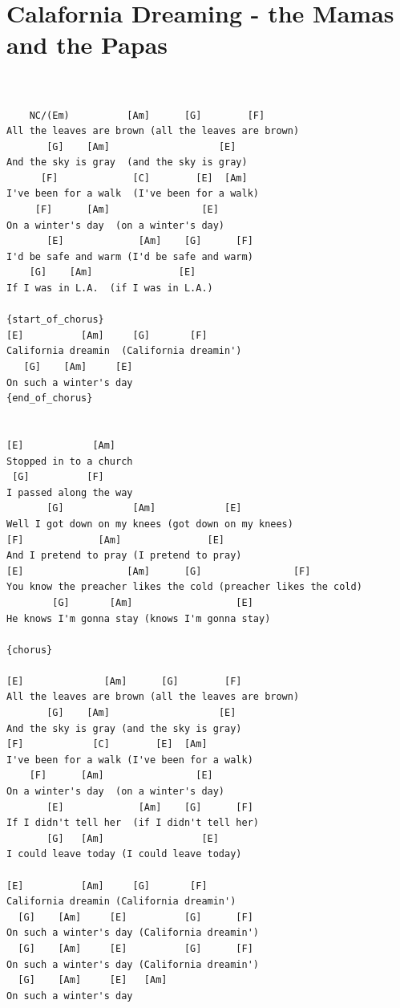 \documentclass[]{book}
\let\stdsection\section
\renewcommand\section{\clearpage\stdsection}
\begin{document}
\hypertarget{calafornia-dreaming---the-mamas-and-the-papas}{%
\section{Calafornia Dreaming - the Mamas and the Papas}\label{calafornia-dreaming---the-mamas-and-the-papas}}

\begin{verbatim}


    NC/(Em)          [Am]      [G]        [F]
All the leaves are brown (all the leaves are brown)
       [G]    [Am]                   [E]
And the sky is gray  (and the sky is gray)
      [F]             [C]        [E]  [Am]
I've been for a walk  (I've been for a walk)
     [F]      [Am]                [E]
On a winter's day  (on a winter's day)
       [E]             [Am]    [G]      [F]
I'd be safe and warm (I'd be safe and warm)
    [G]    [Am]               [E]
If I was in L.A.  (if I was in L.A.)

{start_of_chorus}
[E]          [Am]     [G]       [F]
California dreamin  (California dreamin')
   [G]    [Am]     [E]
On such a winter's day
{end_of_chorus}


[E]            [Am]
Stopped in to a church
 [G]          [F]
I passed along the way
       [G]            [Am]            [E]
Well I got down on my knees (got down on my knees)
[F]             [Am]               [E]
And I pretend to pray (I pretend to pray)
[E]                  [Am]      [G]                [F]
You know the preacher likes the cold (preacher likes the cold)
        [G]       [Am]                  [E]
He knows I'm gonna stay (knows I'm gonna stay)

{chorus}

[E]              [Am]      [G]        [F]
All the leaves are brown (all the leaves are brown)
       [G]    [Am]                   [E]
And the sky is gray (and the sky is gray)
[F]            [C]        [E]  [Am]
I've been for a walk (I've been for a walk)
    [F]      [Am]                [E]
On a winter's day  (on a winter's day)
       [E]             [Am]    [G]      [F]
If I didn't tell her  (if I didn't tell her)
       [G]   [Am]                 [E]
I could leave today (I could leave today)

[E]          [Am]     [G]       [F]
California dreamin (California dreamin')
  [G]    [Am]     [E]          [G]      [F]
On such a winter's day (California dreamin')
  [G]    [Am]     [E]          [G]      [F]
On such a winter's day (California dreamin')
  [G]    [Am]     [E]   [Am]
On such a winter's day
\end{verbatim}
\end{document}
